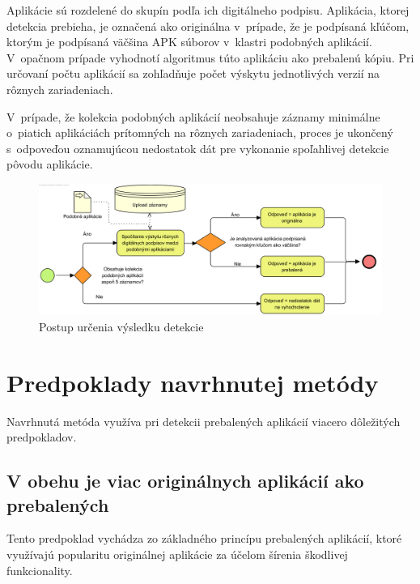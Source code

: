 Aplikácie sú rozdelené do skupín podľa ich digitálneho podpisu. Aplikácia, ktorej detekcia prebieha, je označená ako originálna v~prípade, že je podpísaná kľúčom, ktorým je podpísaná väčšina APK súborov v~klastri podobných aplikácií.  V~opačnom prípade vyhodnotí algoritmus túto aplikáciu ako prebalenú kópiu. Pri určovaní počtu aplikácií sa zohľadňuje počet výskytu jednotlivých verzií na rôznych zariadeniach. 

V~prípade, že kolekcia podobných aplikácií neobsahuje záznamy minimálne o~piatich aplikáciách prítomných na rôznych zariadeniach, proces je ukončený s~odpoveďou oznamujúcou nedostatok dát pre vykonanie spoľahlivej detekcie pôvodu aplikácie.

\begin{figure}[htb]
  \begin{center}
    \includegraphics[width=130mm]{images/detection-original.png}
  \end{center}
  \caption{Postup určenia výsledku detekcie}
  \label{fig:detectionOriginal}
\end{figure}

\newpage
\section{Predpoklady navrhnutej metódy}
Navrhnutá metóda využíva pri detekcii prebalených aplikácií viacero dôležitých predpokladov.

\subsection*{V obehu je viac originálnych aplikácií ako prebalených}
Tento predpoklad vychádza zo základného princípu prebalených aplikácií, ktoré využívajú popularitu originálnej aplikácie za účelom šírenia škodlivej funkcionality.

